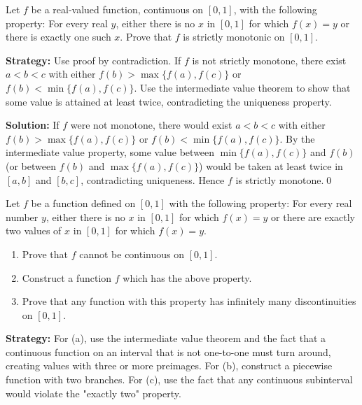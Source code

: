 \begin{problembox}
Let \( f \) be a real-valued function, continuous on \([0, 1]\), with the following property: For every real \( y \), either there is no \( x \) in \([0, 1]\) for which \( f(x) = y \) or there is exactly one such \( x \). Prove that \( f \) is strictly monotonic on \([0, 1]\).
\end{problembox}

\noindent\textbf{Strategy:} Use proof by contradiction. If $f$ is not strictly monotone, there exist $a < b < c$ with either $f(b) > \max\{f(a), f(c)\}$ or $f(b) < \min\{f(a), f(c)\}$. Use the intermediate value theorem to show that some value is attained at least twice, contradicting the uniqueness property.

\bigskip\noindent\textbf{Solution:}
If $f$ were not monotone, there would exist $a<b<c$ with either $f(b)>\max\{f(a),f(c)\}$ or $f(b)<\min\{f(a),f(c)\}$. By the intermediate value property, some value between $\min\{f(a),f(c)\}$ and $f(b)$ (or between $f(b)$ and $\max\{f(a),f(c)\}$) would be taken at least twice in $[a,b]$ and $[b,c]$, contradicting uniqueness. Hence $f$ is strictly monotone.\qed



\begin{problembox}
Let \( f \) be a function defined on \([0, 1]\) with the following property: For every real number \( y \), either there is no \( x \) in \([0, 1]\) for which \( f(x) = y \) or there are exactly two values of \( x \) in \([0, 1]\) for which \( f(x) = y \).
\begin{enumerate}[label=(\alph*)]
\item Prove that \( f \) cannot be continuous on \([0, 1]\).
\item Construct a function \( f \) which has the above property.
\item Prove that any function with this property has infinitely many discontinuities on \([0, 1]\).
\end{enumerate}
\end{problembox}

\noindent\textbf{Strategy:} For (a), use the intermediate value theorem and the fact that a continuous function on an interval that is not one-to-one must turn around, creating values with three or more preimages. For (b), construct a piecewise function with two branches. For (c), use the fact that any continuous subinterval would violate the "exactly two" property.

